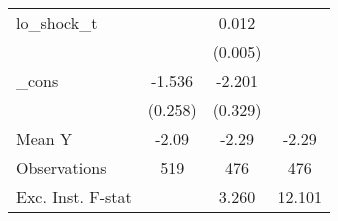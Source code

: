 {\begin{tabular}{l*{3}{c}}
\addlinespace
lo\_shock\_t  &                     &       0.012\sym{**} &                     \\
            &                     &     (0.005)         &                     \\
\addlinespace
\_cons      &      -1.536\sym{***}&      -2.201\sym{***}&                     \\
            &     (0.258)         &     (0.329)         &                     \\
\midrule
Mean Y      &       -2.09         &       -2.29         &       -2.29         \\
Observations&         519         &         476         &         476         \\
Exc. Inst. F-stat&                     &       3.260         &      12.101         \\
\bottomrule
\end{tabular}
}
